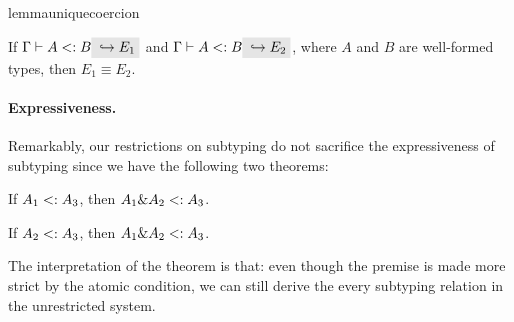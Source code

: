 \begin{restatable}{lemma}{uniquecoercion}
  \label{lemma:unique-coercion}

  If $\Gamma \vdash A \subtype B \yields {E_1}$ and $\Gamma \vdash A \subtype B \yields {E_2}$, where $A$
  and $B$ are well-formed types, then $E_1 \equiv E_2$.
\end{restatable}

\paragraph{Expressiveness.}
Remarkably, our restrictions on subtyping do not sacrifice the expressiveness of
subtyping since we have the following two theorems:
\begin{theorem}
  If $A_1 <: A_3$, then $A_1 \& A_2 <: A_3$.
\end{theorem}
\begin{theorem}
If $A_2 <: A_3$, then $A_1 \& A_2 <: A_3$.
\end{theorem}

The interpretation of the theorem is that: even though the premise is made more
strict by the atomic condition, we can still derive the every subtyping relation
in the unrestricted system.

\begin{comment}
Note that $A$ \emph{exclusive} or $B$ is true if and only if their truth value
differ. Next, we are going to investigate the minimal requirement (necessary and
sufficient conditions) such that the theorem holds.

If $A_1$ and $A_2$ in this setting are the same, for example,
$\tyint \inter \tyint \subtype \tyint$, obviously the theorem will
not hold since both the left $\tyint$ and the right $\tyint$ are a
subtype of $\tyint$.

We can try to rule out such possibilities by making the requirement of
well-formedness stronger. This suggests that the two types on the sides of
$\inter$ should not ``overlap''. In other words, they should be ``disjoint''. It
is easy to determine if two base types are disjoint. For example, $\tyint$
and $\tyint$ are not disjoint. Neither do $\tyint$ and $\code{Nat}$.
Also, types built with different constructors are disjoint. For example,
$\tyint$ and $\tyint \to \tyint$. For function types, disjointness
is harder to visualise. But bear in the mind that disjointness can defined by
the very requirement that the theorem holds.


This result is captured more formally by the following lemma:
\end{comment}


